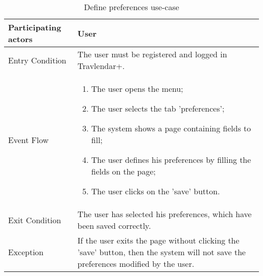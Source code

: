 \begin{table}[H]
	\begin{center}
		\begin{tabular}{ | p{} | p{} | }
		\hline
		Participating actors & User\\
		\hline
		Entry Condition & The user must be registered and logged in Travlendar+.\\
		\hline
		Event Flow & 
			\begin{enumerate}
				\item The user opens the menu;
				\item The user selects the tab 'preferences';
				\item The system shows a page containing fields to fill;
				\item The user defines his preferences by filling the fields on the page;
				\item The user clicks on the 'save' button.
			\end{enumerate} \\
		\hline
		Exit Condition & The user has selected his preferences, which have been saved correctly.\\
		\hline
		Exception & If the user exits the page without clicking the 'save' button, then the system will not save the preferences modified by the user.\\ 
		\hline
		\end{tabular}
	\end{center}
	\caption{Define preferences use-case}
\end{table}